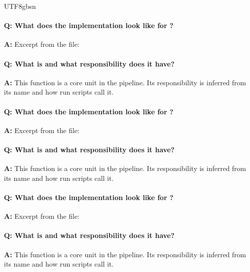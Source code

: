 \documentclass[11pt]{article}
\begin{document}
\begin{CJK*}{UTF8}{gbsn}
\paragraph{Q: What does the implementation look like for \texttt{}?}
\textbf{A:} Excerpt from the file:

\vspace{1mm}


\paragraph{Q: What is \texttt{} and what responsibility does it have?}
\textbf{A:} This function is a core unit in the pipeline. Its responsibility is inferred from its name and how run scripts call it.

\paragraph{Q: What does the implementation look like for \texttt{}?}
\textbf{A:} Excerpt from the file:

\vspace{1mm}


\paragraph{Q: What is \texttt{} and what responsibility does it have?}
\textbf{A:} This function is a core unit in the pipeline. Its responsibility is inferred from its name and how run scripts call it.

\paragraph{Q: What does the implementation look like for \texttt{}?}
\textbf{A:} Excerpt from the file:

\vspace{1mm}


\paragraph{Q: What is \texttt{} and what responsibility does it have?}
\textbf{A:} This function is a core unit in the pipeline. Its responsibility is inferred from its name and how run scripts call it.


\end{CJK*}
\end{document}
